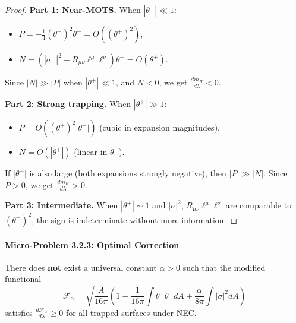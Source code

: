 \begin{proof}
\textbf{Part 1: Near-MOTS.}
When $|\theta^+| \ll 1$:
\begin{itemize}
    \item $P = -\frac{1}{4}(\theta^+)^2\theta^- = O((\theta^+)^2)$,
    \item $N = (|\sigma^+|^2 + R_{\mu\nu}\ell^\mu\ell^\nu)\theta^+ = O(\theta^+)$.
\end{itemize}
Since $|N| \gg |P|$ when $|\theta^+| \ll 1$, and $N < 0$, we get $\frac{dm_H}{d\lambda} < 0$.

\textbf{Part 2: Strong trapping.}
When $|\theta^+| \gg 1$:
\begin{itemize}
    \item $P = O((\theta^+)^2 |\theta^-|)$ (cubic in expansion magnitudes),
    \item $N = O(|\theta^+|)$ (linear in $\theta^+$).
\end{itemize}
If $|\theta^-|$ is also large (both expansions strongly negative), then $|P| \gg |N|$. Since $P > 0$, we get $\frac{dm_H}{d\lambda} > 0$.

\textbf{Part 3: Intermediate.}
When $|\theta^+| \sim 1$ and $|\sigma|^2$, $R_{\mu\nu}\ell^\mu\ell^\nu$ are comparable to $(\theta^+)^2$, the sign is indeterminate without more information.
\end{proof}

\paragraph{Micro-Problem 3.2.3: Optimal Correction}

\begin{theorem}\label{thm:noalpha}
There does \textbf{not} exist a universal constant $\alpha > 0$ such that the modified functional
\begin{equation}
    \mathcal{F}_\alpha = \sqrt{\frac{A}{16\pi}}\left(1 - \frac{1}{16\pi}\int\theta^+\theta^- dA + \frac{\alpha}{8\pi}\int|\sigma|^2 dA\right)
\end{equation}
satisfies $\frac{d\mathcal{F}_\alpha}{d\lambda} \geq 0$ for all trapped surfaces under NEC.
\end{theorem}

